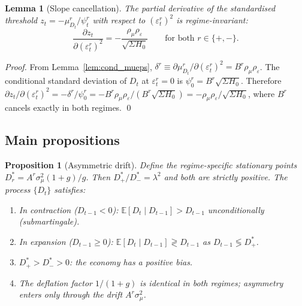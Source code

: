 \documentclass[12pt,a4paper]{article}
\newtheorem{proposition}[theorem]{Proposition}
\newtheorem{lemma}[theorem]{Lemma}
\theoremstyle{definition}
\begin{document}
\begin{lemma}[Slope cancellation]
\label{lem:slope_cancel}
The partial derivative of the standardised threshold $z_t =
-\mu^r_{D_t}/\psi^r_t$ with respect to $(\varepsilon^r_t)^2$ is
regime-invariant:
\[
\frac{\partial z_t}{\partial(\varepsilon^r_t)^2}
= -\frac{\rho_\mu\rho_\varepsilon}{\sqrt{\Sigma H_0}}
  \qquad \text{for both } r \in \{+,-\}.
\]
\end{lemma}

\begin{proof}
From Lemma~\ref{lem:cond_mueps}, $\delta^r \equiv \partial
\mu^r_{D_t}/\partial(\varepsilon^r_t)^2 = B^r\rho_\mu\rho_\varepsilon$.
The conditional standard deviation of $D_t$ at $\varepsilon^r_t = 0$
is $\psi^r_0 = B^r\sqrt{\Sigma H_0}$. Therefore
$\partial z_t/\partial(\varepsilon^r_t)^2 = -\delta^r/\psi^r_0 =
-B^r\rho_\mu\rho_\varepsilon/(B^r\sqrt{\Sigma H_0}) =
-\rho_\mu\rho_\varepsilon/\sqrt{\Sigma H_0}$,
where $B^r$ cancels exactly in both regimes.
\qed
\end{proof}

\subsection{Main propositions}

\begin{proposition}[Asymmetric drift]
\label{prop:asym_drift}
Define the regime-specific stationary points $D^*_r = A^r\sigma^2_\mu(1+g)/g$.
Then $D^*_+/D^*_- = \lambda^2$ and both are strictly positive. The
process $\{D_t\}$ satisfies:
\begin{enumerate}
  \item[(i)] In contraction ($D_{t-1}<0$): $\mathbb{E}[D_t \mid
    D_{t-1}] > D_{t-1}$ unconditionally (submartingale).
  \item[(ii)] In expansion ($D_{t-1}\geq0$): $\mathbb{E}[D_t \mid
    D_{t-1}] \gtrless D_{t-1}$ as $D_{t-1} \lessgtr D^*_+$.
  \item[(iii)] $D^*_+ > D^*_- > 0$: the economy has a positive bias.
  \item[(iv)] The deflation factor $1/(1+g)$ is identical in both
    regimes; asymmetry enters only through the drift $A^r\sigma^2_\mu$.
\end{enumerate}
\end{proposition}
\end{document}
